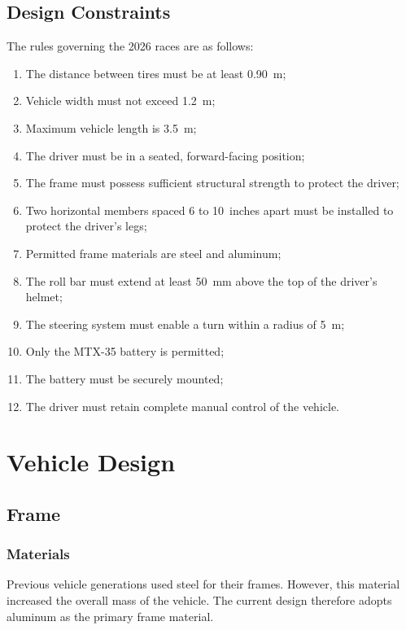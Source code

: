 \documentclass[12pt]{article}
\begin{document}
\subsection{Design Constraints}
The rules governing the 2026 races are as follows:
\begin{enumerate}
  \item The distance between tires must be at least 0.90~m;
  \item Vehicle width must not exceed 1.2~m;
  \item Maximum vehicle length is 3.5~m;
  \item The driver must be in a seated, forward-facing position;
  \item The frame must possess sufficient structural strength to protect the
        driver;
  \item Two horizontal members spaced 6 to 10~inches apart must be installed
        to protect the driver's legs;
  \item Permitted frame materials are steel and aluminum;
  \item The roll bar must extend at least 50~mm above the top of the
        driver's helmet;
  \item The steering system must enable a turn within a radius of 5~m;
  \item Only the MTX-35 battery is permitted;
  \item The battery must be securely mounted;
  \item The driver must retain complete manual control of the vehicle.
\end{enumerate}

\section{Vehicle Design}

\subsection{Frame}

\subsubsection{Materials}

Previous vehicle generations used steel for their frames. However, this
material increased the overall mass of the vehicle. The current design
therefore adopts aluminum as the primary frame material.
\end{document}
